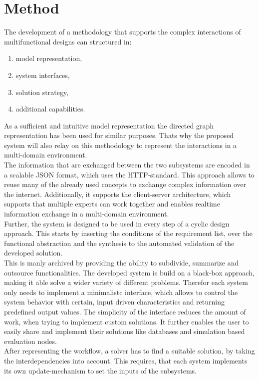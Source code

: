 \section{Method}
The development of a methodology that supports the complex interactions of multifunctional designs can structured in:
\begin{enumerate}
    \item model representation,
    \item system interfaces,
    \item solution strategy,
    \item additional capabilities.
\end{enumerate}
As a sufficient and intuitive model representation the directed graph representation has been used for similar purposes.
Thats why the proposed system will also relay on this methodology 
to represent the interactions in a multi-domain environment.\\
The information that are exchanged between the two subsystems
are encoded in a scalable JSON format, which uses the HTTP-standard.
This approach allows to reuse many of the already used concepts to exchange complex information over the internet.
Additionally, it supports the client-server architecture, 
which supports that multiple experts can work together and
enables realtime information exchange in a multi-domain environment.\\
Further, the system is designed to be used in every step of a cyclic design approach.
This starts by inserting the conditions of the requirement list, 
over the functional abstraction and the synthesis to the automated validation of the developed solution.\\
This is manly archived by providing the ability to subdivide, summarize and outsource functionalities. 
The developed system is build on a black-box approach, making it able solve a wider variety of different problems.
Therefor each system only needs to implement a minimalistc interface, 
which allows to control the system behavior with certain, input driven characteristics and returning predefined output values.
The simplicity of the interface reduces the amount of work, when trying to implement custom solutions.
It further enables the user to easily share and implement their solutions like databases and simulation based evaluation nodes.\\
After representing the workflow, a solver has to find a suitable solution, by taking the interdependencies into account.
This requires, that each system implements its own update-mechanism to set the inputs of the subsystems.
